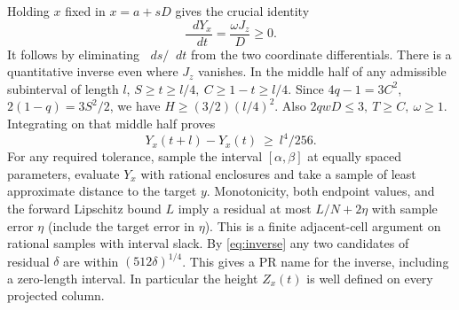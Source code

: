 \documentclass[11pt,letterpaper]{article}
\newcommand{\dd}{\mathop{}\!d}
\begin{document}
Holding \(x\) fixed in \(x=a+sD\) gives the crucial identity
\[
 \frac{\dd Y_x}{\dd t}=\frac{\omega J_z}{D}\ge0 .
\]
It follows by eliminating \(\dd s/\dd t\) from the two coordinate differentials. There is a quantitative inverse even where \(J_z\) vanishes. In the middle half of any admissible subinterval of length \(l\), \(S\ge t\ge l/4,\ C\ge1-t\ge l/4\). Since \(4q-1=3C^2\), \(2(1-q)=3S^2/2\), we have \(H\ge(3/2)(l/4)^2\). Also \(2qwD\le3,\ T\ge C,\ \omega\ge1\). Integrating on that middle half proves
\begin{equation}
 Y_x(t+l)-Y_x(t)\ \ge\ l^4/256 . \label{eq:inverse}
\end{equation}
For any required tolerance, sample the interval \([\alpha,\beta]\) at equally spaced parameters, evaluate \(Y_x\) with rational enclosures and take a sample of least approximate distance to the target \(y\). Monotonicity, both endpoint values, and the forward Lipschitz bound \(L\) imply a residual at most \(L/N+2\eta\) with sample error \(\eta\) (include the target error in \(\eta\)). This is a finite adjacent-cell argument on rational samples with interval slack. By \eqref{eq:inverse} any two candidates of residual \(\delta\) are within \((512\delta)^{1/4}\). This gives a PR name for the inverse, including a zero-length interval. In particular the height \(Z_x(t)\) is well defined on every projected column.
\end{document}
